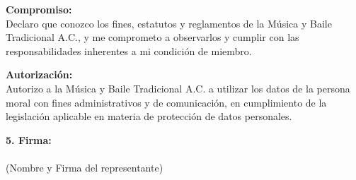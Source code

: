 \documentclass[a4paper,12pt]{article}
\begin{document}
\vspace{0.5cm}

\noindent
\textbf{Compromiso:} \\[0.2cm]
Declaro que conozco los fines, estatutos y reglamentos de la Música y Baile Tradicional A.C., y me comprometo a observarlos y cumplir con las responsabilidades inherentes a mi condición de miembro.

\vspace{0.5cm}

\noindent
\textbf{Autorización:} \\[0.2cm]
Autorizo a la Música y Baile Tradicional A.C. a utilizar los datos de la persona moral con fines administrativos y de comunicación, en cumplimiento de la legislación aplicable en materia de protección de datos personales.

\vspace{1cm}

\noindent
\textbf{5. Firma:} \\
\underline{\hspace{10cm}} \hfill  \\
(Nombre y Firma del representante) 
\end{document}
